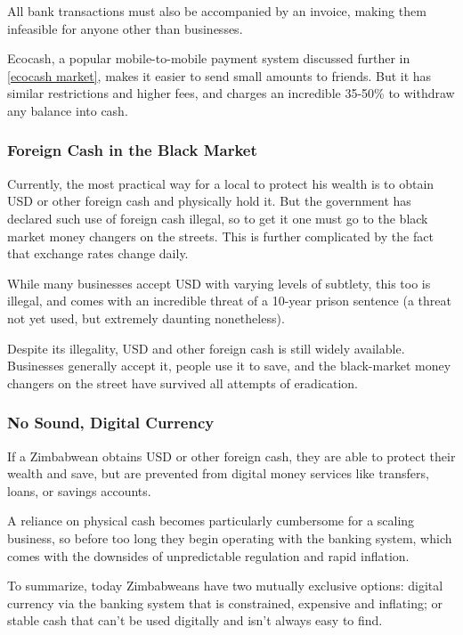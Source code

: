 \documentclass{article}
\begin{document}
All bank transactions must also be accompanied by an invoice, making them infeasible for anyone other than businesses.

Ecocash, a popular mobile-to-mobile payment system discussed further in \ref{ecocash market}, makes it easier to send small amounts to friends. But it has similar restrictions and higher fees, and charges an incredible 35-50\% to withdraw any balance into cash.

\subsubsection{Foreign Cash in the Black Market} \label{usd}

Currently, the most practical way for a local to protect his wealth is to obtain USD or other foreign cash and physically hold it. But the government has declared such use of foreign cash illegal, so to get it one must go to the black market money changers on the streets. This is further complicated by the fact that exchange rates change daily.

While many businesses accept USD with varying levels of subtlety, this too is illegal, and comes with an incredible threat of a 10-year prison sentence (a threat not yet used, but extremely daunting nonetheless).

Despite its illegality, USD and other foreign cash is still widely available. Businesses generally accept it, people use it to save, and the black-market money changers on the street have survived all attempts of eradication.

\subsubsection{No Sound, Digital Currency} \label{gap}

If a Zimbabwean obtains USD or other foreign cash, they are able to protect their wealth and save, but are prevented from digital money services like transfers, loans, or savings accounts.

A reliance on physical cash becomes particularly cumbersome for a scaling business, so before too long they begin operating with the banking system, which comes with the downsides of unpredictable regulation and rapid inflation.

To summarize, today Zimbabweans have two mutually exclusive options: digital currency via the banking system that is constrained, expensive and inflating; or stable cash that can't be used digitally and isn't always easy to find.
\end{document}
